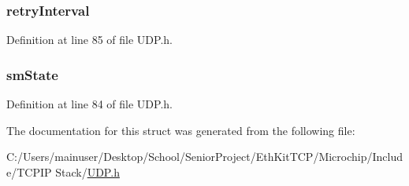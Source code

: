 \subsubsection[{retry\+Interval}]{ retry\+Interval}\label{struct_u_d_p___s_o_c_k_e_t___i_n_f_o_a807f78c2939992452223356ae72340cf}


Definition at line 85 of file U\+D\+P.\+h.

\hypertarget{struct_u_d_p___s_o_c_k_e_t___i_n_f_o_ac0eb7113e023d3e694b1eba331a036cd}{}
\subsubsection[{sm\+State}]{ sm\+State}\label{struct_u_d_p___s_o_c_k_e_t___i_n_f_o_ac0eb7113e023d3e694b1eba331a036cd}


Definition at line 84 of file U\+D\+P.\+h.



The documentation for this struct was generated from the following file\+:\begin{DoxyCompactItemize}
\item 
C\+:/\+Users/mainuser/\+Desktop/\+School/\+Senior\+Project/\+Eth\+Kit\+T\+C\+P/\+Microchip/\+Include/\+T\+C\+P\+I\+P Stack/\hyperlink{_u_d_p_8h}{U\+D\+P.\+h}\end{DoxyCompactItemize}
